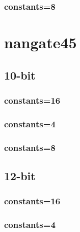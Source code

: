\documentclass{article}
\begin{document}
\subsubsection*{constants=8}
\begin{figure}[H]
\centering
\resizebox{0.95\linewidth}{!}{}
\end{figure}
\section*{nangate45}
\subsection*{10-bit}
\subsubsection*{constants=16}
\begin{figure}[H]
\centering
\resizebox{0.95\linewidth}{!}{}
\end{figure}
\subsubsection*{constants=4}
\begin{figure}[H]
\centering
\resizebox{0.95\linewidth}{!}{}
\end{figure}
\subsubsection*{constants=8}
\begin{figure}[H]
\centering
\resizebox{0.95\linewidth}{!}{}
\end{figure}
\subsection*{12-bit}
\subsubsection*{constants=16}
\begin{figure}[H]
\centering
\resizebox{0.95\linewidth}{!}{}
\end{figure}
\subsubsection*{constants=4}
\begin{figure}[H]
\centering
\resizebox{0.95\linewidth}{!}{}
\end{figure}
\end{document}
